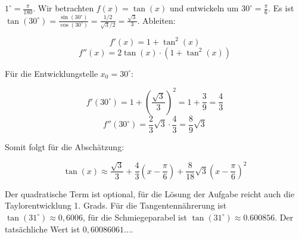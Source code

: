 \item $1^\circ = \frac{\pi}{180}$. Wir betrachten $f(x)=\tan(x)$ und entwickeln um $30^\circ = \frac{\pi}{6}$. Es ist $\tan(30^\circ) = \frac{\sin(30^\circ)}{\cos(30^\circ)} = \frac{1/2}{\sqrt{3}/2} = \frac{\sqrt{3}}{3}$. Ableiten:

$$f'(x) =  1 + \tan^2(x)$$
$$f''(x) =  2\tan(x) \cdot (1 + \tan^2(x))$$

Für die Entwicklungstelle $x_0=30^\circ$:

$$f'(30^\circ) = 1 + (\frac{\sqrt{3}}{3})^2 = 1+ \frac{3}{9} = \frac{4}{3}$$
$$f''(30^\circ) = \frac{2}{3}\sqrt{3} \cdot \frac{4}{3} = \frac{8}{9}\sqrt{3}$$

Somit folgt für die Abschätzung:

$$\tan(x) \approx \frac{\sqrt{3}}{3} + \frac{4}{3} (x-\frac{\pi}{6}) + \frac{8}{18}\sqrt{3}(x-\frac{\pi}{6})^2$$

Der quadratische Term ist optional, für die Lösung der Aufgabe reicht auch die Taylorentwicklung 1. Grads. Für die Tangentennährerung ist $\tan(31^\circ) \approx 0,6006$, für die Schmiegeparabel ist $\tan(31^\circ) \approx 0.600856$. Der tatsächliche Wert ist $0,60086061...$.
